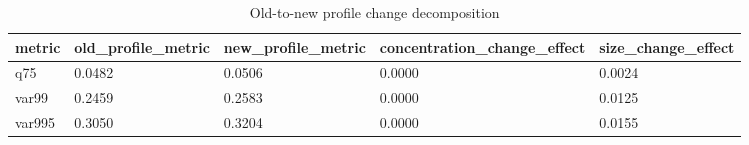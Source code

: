 \begin{table}[htbp]
\centering
\caption{Old-to-new profile change decomposition}
\label{tab:v2_change_decomp}
\begin{tabular}{lllll}
\toprule
\textbf{metric} & \textbf{old_profile_metric} & \textbf{new_profile_metric} & \textbf{concentration_change_effect} & \textbf{size_change_effect} \\
\midrule
q75 & 0.0482 & 0.0506 & 0.0000 & 0.0024 \\
var99 & 0.2459 & 0.2583 & 0.0000 & 0.0125 \\
var995 & 0.3050 & 0.3204 & 0.0000 & 0.0155 \\
\bottomrule
\end{tabular}
\end{table}
